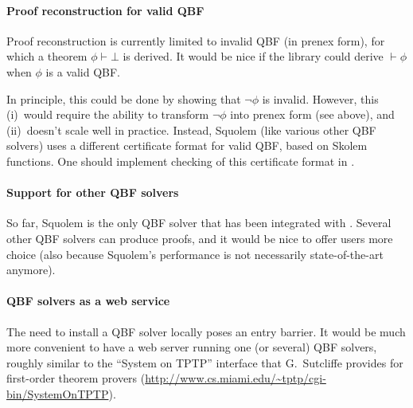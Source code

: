 \paragraph{Proof reconstruction for valid QBF}

Proof reconstruction is currently limited to invalid QBF (in prenex
form), for which a theorem $\phi \vdash \bot$ is derived.  It would be
nice if the library could derive $\vdash \phi$ when $\phi$ is a valid
QBF.

In principle, this could be done by showing that $\neg \phi$ is
invalid.  However, this (i)~would require the ability to transform
$\neg \phi$ into prenex form (see above), and (ii)~doesn't scale well
in practice.  Instead, Squolem (like various other QBF solvers) uses a
different certificate format for valid QBF, based on Skolem functions.
One should implement checking of this certificate format in \HOL.

\paragraph{Support for other QBF solvers}

So far, Squolem is the only QBF solver that has been integrated with
\HOL.  Several other QBF solvers can produce proofs, and it would be
nice to offer \HOL{} users more choice (also because Squolem's
performance is not necessarily state-of-the-art anymore).

\paragraph{QBF solvers as a web service}

The need to install a QBF solver locally poses an entry barrier.  It
would be much more convenient to have a web server running one (or
several) QBF solvers, roughly similar to the ``System on TPTP''
interface that G.~Sutcliffe provides for first-order theorem provers
(\url{http://www.cs.miami.edu/~tptp/cgi-bin/SystemOnTPTP}).


